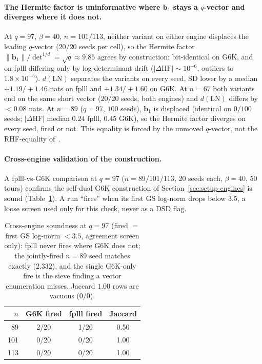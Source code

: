 \documentclass[journal=cic,version=preprint]{iacrj}
\begin{document}
\paragraph{The Hermite factor is uninformative where $\mathbf b_1$ stays a $q$-vector and diverges where it does not.}
At $q=97$, $\beta=40$, $n=101/113$, neither variant on either engine
displaces the leading $q$-vector ($20/20$ seeds per cell), so the Hermite
factor $\|\mathbf b_1\|/\det^{1/d}=\sqrt q\approx9.85$ agrees by
construction: bit-identical on G6K, and on fplll differing only by
log-determinant drift ($|\Delta\mathrm{HF}|\sim10^{-6}$, outliers to
$1.8\times10^{-5}$). $d(\mathrm{LN})$ separates the variants on every seed,
SD lower by a median $+1.19/+1.46$ nats on fplll and $+1.34/+1.60$ on G6K.
At $n=67$ both variants end on the same short vector ($20/20$ seeds, both
engines) and $d(\mathrm{LN})$ differs by $<0.08$ nats. At $n=89$ ($q=97$,
$100$ seeds), $\mathbf b_1$ is displaced (identical on $0/100$ seeds;
$|\Delta\mathrm{HF}|$ median $0.24$ fplll, $0.45$ G6K), so the Hermite factor
diverges on every seed, fired or not. This equality is forced by the unmoved $q$-vector, not the RHF-equality of~\cite{ABLR21,Rowell2024}.

\paragraph{Cross-engine validation of the construction.}
A fplll-vs-G6K comparison at $q=97$ ($n=89/101/113$, 20 seeds each,
$\beta=40$, 50 tours) confirms the self-dual G6K construction of
Section~\ref{sec:setup-engines} is sound (Table~\ref{tab:xeng-sound}). A run ``fires'' when its first GS log-norm
drops below $3.5$, a loose screen used only for this check, never as a DSD
flag.

\begin{table}[tbp]
\centering
\caption{Cross-engine soundness at $q=97$ (fired $=$ first GS log-norm $<3.5$, agreement screen only): fplll never fires where G6K does not; the jointly-fired $n=89$ seed matches exactly ($2.332$), and the single G6K-only fire is the sieve finding a vector enumeration misses. Jaccard $1.00$ rows are vacuous ($0/0$).\label{tab:xeng-sound}}
\begin{tabular}{rccc}
\toprule
$n$ & G6K fired & fplll fired & Jaccard \\
\midrule
89  & 2/20 & 1/20 & 0.50 \\
101 & 0/20 & 0/20 & 1.00 \\
113 & 0/20 & 0/20 & 1.00 \\
\bottomrule
\end{tabular}
\end{table}
\end{document}
